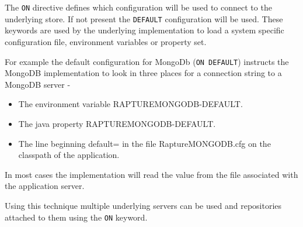 The \verb+ON+ directive defines which configuration will be used to connect to the underlying store. If
not present the \verb+DEFAULT+ configuration will be used. These keywords are used by the underlying
implementation to load a system specific configuration file, environment variables or property set.

For example the default configuration for MongoDb (\verb+ON DEFAULT+) instructs the MongoDB implementation
to look in three places for a connection string to a MongoDB server -

\begin{itemize}
\item{The environment variable RAPTUREMONGODB-DEFAULT.}
\item{The java property RAPTUREMONGODB-DEFAULT.}
\item{The line beginning default= in the file RaptureMONGODB.cfg on the classpath of the application.}
\end{itemize}

In most cases the implementation will read the value from the file associated with the application server.

Using this technique multiple underlying servers can be used and repositories attached to them using the
\verb+ON+ keyword.

